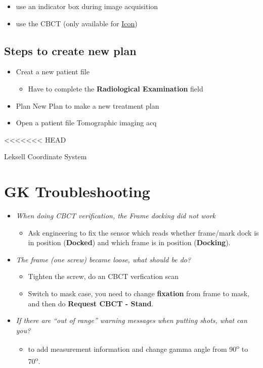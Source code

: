 \documentclass[]{book}
\providecommand{\tightlist}{%
  \setlength{\itemsep}{0pt}\setlength{\parskip}{0pt}}
\theoremstyle{definition}
\theoremstyle{definition}
\theoremstyle{definition}
\theoremstyle{remark}
\begin{document}
\begin{itemize}
\tightlist
\item
  use an indicator box during image acquisition
\item
  use the CBCT (only available for
  \href{https://www.youtube.com/watch?v=ZeFFwkxnoME}{Icon})
\end{itemize}

\subsection{Steps to create new plan}\label{steps-to-create-new-plan}

\begin{itemize}
\tightlist
\item
  Creat a new patient file

  \begin{itemize}
  \tightlist
  \item
    Have to complete the \textbf{Radiological Examination} field
  \end{itemize}
\item
  Plan \textbar{} New Plan to make a new treatment plan
\item
  Open a patient file Tomographic imaging acq
\end{itemize}
<<<<<<< HEAD

Leksell Coordinate System

\section{GK Troubleshooting}\label{gk-troubleshooting}

\begin{itemize}
\tightlist
\item
  \emph{When doing CBCT verification, the Frame docking did not work}

  \begin{itemize}
  \tightlist
  \item
    Ask engineering to fix the sensor which reads whether frame/mark
    dock is in position (\textbf{Docked}) and which frame is in position
    (\textbf{Docking}).
  \end{itemize}
\item
  \emph{The frame (one screw) became loose, what should be do?}

  \begin{itemize}
  \tightlist
  \item
    Tighten the screw, do an CBCT verfication scan
  \item
    Switch to mask case, you need to change \textbf{fixation} from frame
    to mask, and then do \textbf{Request CBCT - Stand}.
  \end{itemize}
\item
  \emph{If there are ``out of range'' warning messages when putting
  shots, what can you?}

  \begin{itemize}
  \tightlist
  \item
    to add measurement information and change gamma angle from
    90\textsuperscript{o} to 70\textsuperscript{o}.
  \end{itemize}
\end{itemize}
\end{document}
